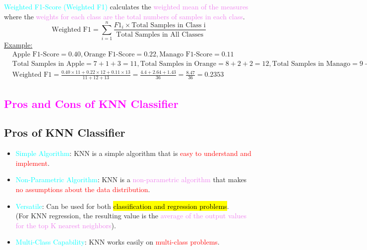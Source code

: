 \documentclass{book}
\begin{document}
\textcolor{cyan}{Weighted F1-Score (Weighted F1)} calculates the \textcolor{violet}{weighted mean of the measures} where the \textcolor{violet}{weights for each class are the total numbers of samples in each class}.\\
\[
    \text{Weighted F1} = \sum_{i=1}^{n} \frac{F1_i \times \text{Total Samples in Class i}}{\text{Total Samples in All Classes}}
\]
\underline{Example:}\\
\begin{align*}
    & \text{Apple F1-Score} = 0.40, \text{Orange F1-Score} = 0.22, \text{Manago F1-Score} = 0.11 \\
    & \text{Total Samples in Apple} = 7 + 1 + 3 = 11, \text{Total Samples in Orange} = 8 + 2 + 2 = 12, \text{Total Samples in Manago} = 9 + 3 + 1 = 13 \\
    & \text{Weighted F1} = \frac{0.40 \times 11 + 0.22 \times 12 + 0.11 \times 13}{11 + 12 + 13} = \frac{4.4 + 2.64 + 1.43}{36} = \frac{8.47}{36} = 0.2353
\end{align*}
\textcolor{magenta}{\section{\textbf{Pros and Cons of KNN Classifier}}}
\subsection{Pros of KNN Classifier}
\begin{itemize}
    \item \textcolor{cyan}{Simple Algorithm}: KNN is a simple algorithm that is \textcolor{red}{easy to understand and implement}.
    \item \textcolor{cyan}{Non-Parametric Algorithm}: KNN is a \textcolor{violet}{non-parametric algorithm} that makes \textcolor{red}{no assumptions about the data distribution}.
    \item \textcolor{cyan}{Versatile}: Can be used for both \hl{classification and regression problems}.\\
    (For KNN regression, the resulting value is the \textcolor{violet}{average of the output values for the top K nearest neighbors}).
    \item \textcolor{cyan}{Multi-Class Capability}: KNN works easily on \textcolor{red}{multi-class problems}.
\end{itemize}
\end{document}
